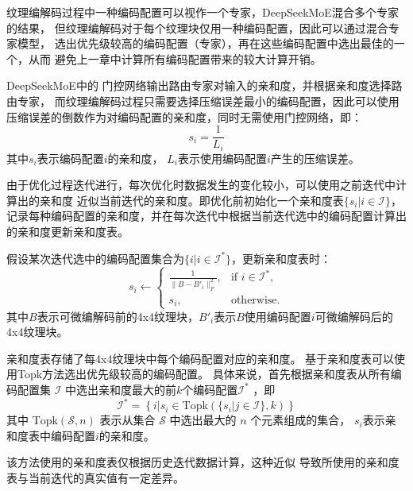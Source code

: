 纹理编解码过程中一种编码配置可以视作一个专家，DeepSeekMoE\cite{dai2024deepseekmoe}混合多个专家的结果，
但纹理编解码对于每个纹理块仅用一种编码配置，因此可以通过混合专家模型，
选出优先级较高的编码配置（专家），再在这些编码配置中选出最佳的一个，从而
避免上一章中计算所有编码配置带来的较大计算开销。

DeepSeekMoE\cite{dai2024deepseekmoe}中的
门控网络输出路由专家对输入的亲和度，并根据亲和度选择路由专家，
而纹理编解码过程只需要选择压缩误差最小的编码配置，因此可以使用压缩误差的倒数作为对编码配置的亲和度，同时无需使用门控网络，即：
\begin{equation}
s_i=\frac{1}{L_i}
\end{equation}
其中$s_i$表示编码配置$i$的亲和度，
$L_i$表示使用编码配置$i$产生的压缩误差。

由于优化过程迭代进行，每次优化时数据发生的变化较小，可以使用之前迭代中计算出的亲和度
近似当前迭代的亲和度。即优化前初始化一个亲和度表$\{s_i|i\in\mathcal{I}\}$，
记录每种编码配置的亲和度，并在每次迭代中根据当前迭代选中的编码配置计算出的亲和度更新亲和度表。

假设某次迭代选中的编码配置集合为$\{i|i\in\mathcal{I}^*\}$，更新亲和度表时：
\begin{equation}
    s_i\leftarrow
    \begin{cases} 
    \frac{1}{\|B-B'_i\|_F^2}, & \text{if } i\in\mathcal{I}^*,\\
    s_i, & \text{otherwise}.
    \end{cases}
\end{equation}
其中$B$表示可微编解码前的4x4纹理块，$B'_i$表示$B$使用编码配置$i$可微编解码后的4x4纹理块。

亲和度表存储了每4x4纹理块中每个编码配置对应的亲和度。
基于亲和度表可以使用Topk方法选出优先级较高的编码配置。
具体来说，首先根据亲和度表从所有编码配置集 $\mathcal{I}$ 中选出亲和度最大的前$k$个编码配置$\mathcal{I}^*$ ，即
\begin{equation}
\label{eq41}
\mathcal{I}^*=\left\{i|s_i\in\text{Topk}(\{s_i|j\in\mathcal{I}\},k)\right\}
\end{equation}
其中 $\text{Topk}(\mathcal{S},n)$ 表示从集合 $\mathcal{S}$ 中选出最大的 $n$ 个元素组成的集合，
$s_i$表示亲和度表中编码配置$i$的亲和度。

该方法使用的亲和度表仅根据历史迭代数据计算，这种近似
导致所使用的亲和度表与当前迭代的真实值有一定差异。

